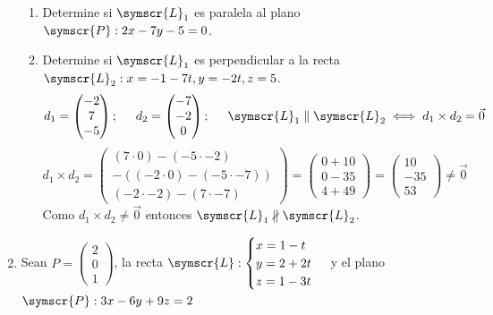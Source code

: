 \documentclass{article}
\def\fancyL{\symscr{L}}
\def\fancyP{\symscr{P}}
\begin{document}
\begin{enumerate}
\begin{enumerate}[label=\listAlph]
        \item Determine si \(\fancyL_1\) es paralela al plano \(\fancyP: 2x - 7y - 5 = 0\).
        \item Determine si \(\fancyL_1\) es perpendicular a la recta \(\fancyL_2: x = -1 -7t, y = -2t, z = 5\).
            \[
                d_1 = \begin{pmatrix}
                    -2 \\ 7 \\ -5
                \end{pmatrix};
                \hspace{0.5cm}
                d_2 = \begin{pmatrix}
                    -7 \\ -2 \\ 0
                \end{pmatrix};
                \hspace{0.5cm}
                \fancyL_1 \parallel \fancyL_2 \iff d_1 \times d_2 = \vec{0}
            \]
            \[
                d_1 \times d_2 
                = 
                \begin{pmatrix}
                    (7 \cdot 0) - (-5 \cdot -2) \\
                    -( (-2 \cdot 0) - (-5 \cdot -7) ) \\
                    (-2 \cdot -2) - (7 \cdot -7)
                \end{pmatrix}
                =
                \begin{pmatrix}
                    0 + 10 \\ 
                    0 - 35 \\
                    4 + 49
                \end{pmatrix}
                =
                \begin{pmatrix}
                    10 \\ -35 \\ 53
                \end{pmatrix}
                \neq
                \vec{0}
            \]
            Como \(d_1 \times d_2 \neq \vec{0}\) entonces \(\fancyL_1 \nparallel \fancyL_2\).
    \end{enumerate}
\item Sean \(P = \left(\begin{smallmatrix}2 \\ 0 \\ 1\end{smallmatrix}\right)\), la recta \(\fancyL: \begin{cases}x = 1 -t \\ y = 2 + 2t \\ z = 1 - 3t\end{cases}\) y el plano \(\fancyP: 3x -6y + 9z = 2\)

\end{enumerate}
\end{document}
